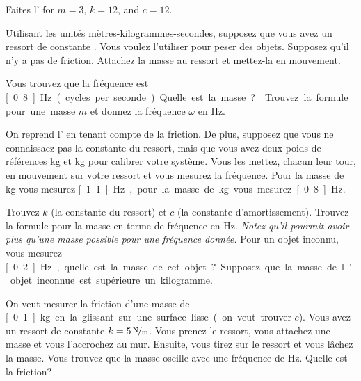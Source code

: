 \begin{exercise}
Faites l' for
$m=3$, $k=12$, and $c=12$.
\end{exercise}

\begin{exercise} \label{mv:exwt1}
Utilisant les unités mètres-kilogrammes-secondes,
supposez que vous avez un ressort de constante  .
Vous voulez l'utiliser pour peser des objets. Supposez qu'il n'y a pas de friction. Attachez la masse au ressort et mettez-la en mouvement.  
\begin{tasks}
\task Vous trouvez que la fréquence est \unit[0.8]{Hz} (cycles per seconde).  Quelle est la masse?
\task Trouvez la formule pour une masse  $m$ et donnez la fréquence $\omega$ en \unit{Hz}.
\end{tasks}
\end{exercise}

\begin{exercise}
On reprend l' en tenant compte de la friction.
De plus, supposez que vous ne connaissaez pas la constante du ressort, mais que vous avez deux poids de références  \unit[1]{kg} et \unit[2]{kg} pour calibrer votre système.
Vous les mettez, chacun leur tour, en mouvement sur votre ressort et vous mesurez la fréquence. Pour la masse de  \unit[1]{kg} vous mesurez \unit[1.1]{Hz}, pour la masse de  \unit[2]{kg} vous mesurez \unit[0.8]{Hz}.
\begin{tasks}
\task Trouvez $k$ (la constante du ressort) et $c$ (la constante d'amortissement).
\task Trouvez la formule pour la masse en terme de fréquence en Hz.  \emph{Notez qu'il pourrait avoir plus qu'une masse possible pour une fréquence donnée.}
\task Pour un objet inconnu, vous mesurez \unit[0.2]{Hz}, quelle est la masse de cet objet?   Supposez que la masse de l'objet inconnue est supérieure un kilogramme.
\end{tasks}
\end{exercise}

\begin{exercise}
On veut mesurer la friction d'une masse de  \unit[0.1]{kg} en la glissant sur une surface lisse (on veut trouver $c$).  Vous avez un ressort de constante  $k=\unitfrac[5]{N}{m}$.  Vous prenez le ressort, vous attachez une masse et vous l'accrochez au mur. Ensuite, vous tirez sur le ressort et vous lâchez la masse. Vous trouvez que la masse oscille avec une fréquence de  \unit[1]{Hz}.
Quelle est la friction?
\end{exercise}

